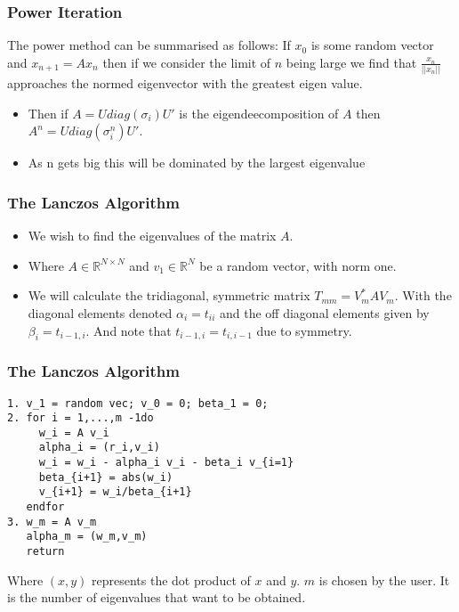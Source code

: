 \documentclass[pdf]{beamer}
\begin{document}
\begin{frame}
\frametitle{Power Iteration}

The power method can be summarised as follows: If $x_0$ is some random vector and $x_{n+1}=A x_n$ then if we consider the limit of $n$ being large we find that $\frac{x_n}{||x_n||}$ approaches the normed eigenvector with the greatest eigen value. 
\begin{itemize}
\item Then if $A=U {diag} (\sigma_i) U'$ is the eigendeecomposition of $A$ then $A^n = U {diag}(\sigma^n_i) U'$.
\item As n gets big this will be dominated by the largest eigenvalue
\end{itemize}
\end{frame}



\begin{frame}
\frametitle{The Lanczos Algorithm}
\begin{itemize}
\item We wish to find the eigenvalues of the matrix $A$.

\item Where $A \in \mathbb{R}^{N \times N}$ and $v_1 \in \mathbb{R}^N$ be a random vector, with norm one.

\item We will calculate the tridiagonal, symmetric matrix $T_{mm} = V_m^* A V_m$. With the diagonal elements denoted $\alpha_i=t_{ii}$ and the off diagonal elements given by $\beta_i = t_{i-1,i}$. And note that $t_{i-1,i}=t_{i,i-1}$ due to symmetry.
\end{itemize}

\end{frame}


\begin{frame}[fragile]
\frametitle{The Lanczos Algorithm}
\begin{verbatim}
1. v_1 = random vec; v_0 = 0; beta_1 = 0;
2. for i = 1,...,m -1do
     w_i = A v_i
     alpha_i = (r_i,v_i)
     w_i = w_i - alpha_i v_i - beta_i v_{i=1}
     beta_{i+1} = abs(w_i)
     v_{i+1} = w_i/beta_{i+1}
   endfor
3. w_m = A v_m
   alpha_m = (w_m,v_m)
   return
\end{verbatim}

Where $(x,y)$ represents the dot product of $x$ and $y$. $m$ is chosen by the user. It is the number of eigenvalues that want to be obtained.


\end{frame}
\end{document}
